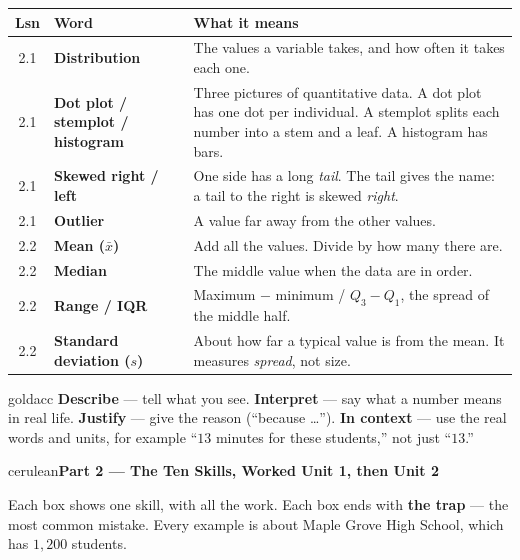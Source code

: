 \documentclass[10pt]{article}
\newcommand{\parthead}[1]{%
  \vspace{6pt}\noindent
  \begin{headlinebox}{cerulean}{\color{white}\bfseries #1}\end{headlinebox}%
  \vspace{4pt}}
\begin{document}
\vspace{4pt}
\boxguard[16]
\begin{tabularx}{\linewidth}{@{} c >{\raggedright\arraybackslash\bfseries}p{3.4cm} X @{}}
\rowcolor{frost}
\textbf{Lsn} & \textbf{Word} & \textbf{What it means} \\
\midrule
2.1 & Distribution & The values a variable takes, and how often it takes each one. \\
2.1 & Dot plot / stemplot / histogram & Three pictures of quantitative data. A dot plot has one
      dot per individual. A stemplot splits each number into a stem and a leaf. A histogram
      has bars. \\
2.1 & Skewed right / left & One side has a long \emph{tail}. The tail gives the name: a tail
      to the right is skewed \emph{right}. \\
2.1 & Outlier & A value far away from the other values. \\
2.2 & Mean ($\bar{x}$) & Add all the values. Divide by how many there are. \\
2.2 & Median & The middle value when the data are in order. \\
2.2 & Range / IQR & Maximum $-$ minimum / $Q_3 - Q_1$, the spread of the middle half. \\
2.2 & Standard deviation ($s$) & About how far a typical value is from the mean. It measures
      \emph{spread}, not size. \\
\end{tabularx}

\vspace{6pt}
\boxguard[14]
\begin{blurbbox}{goldacc}
\small
\textbf{Describe} --- tell what you see. \quad
\textbf{Interpret} --- say what a number means in real life. \quad
\textbf{Justify} --- give the reason (``because \dots''). \quad
\textbf{In context} --- use the real words and units, for example ``$13$ minutes for these
students,'' not just ``$13$.''
\end{blurbbox}
\normalsize

\vspace{4pt}
\boxguard[22]
\parthead{Part 2 --- The Ten Skills, Worked \hfill Unit 1, then Unit 2}

\small
Each box shows one skill, with all the work. Each box ends with \textbf{the trap} --- the most
common mistake. Every example is about Maple Grove High School, which has $1{,}200$ students.
\end{document}
